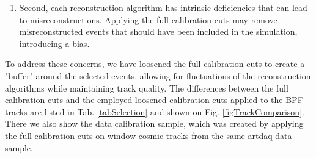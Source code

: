 \begin{enumerate}
\begin{enumerate}
\item Second, each reconstruction algorithm has intrinsic deficiencies that can lead to misreconstructions. Applying the full calibration cuts may remove misreconstructed events that should have been included in the simulation, introducing a bias.
\end{enumerate}

To address these concerns, we have loosened the full calibration cuts to create a "buffer" around the selected events, allowing for fluctuations of the reconstruction algorithms while maintaining track quality. The differences between the full calibration cuts and the employed loosened calibration cuts applied to the BPF tracks are listed in Tab. \ref{tabSelection} and shown on Fig. \ref{figTrackComparison}. There we also show the data calibration sample, which was created by applying the full calibration cuts on window cosmic tracks from the same artdaq data sample.
\end{enumerate}


